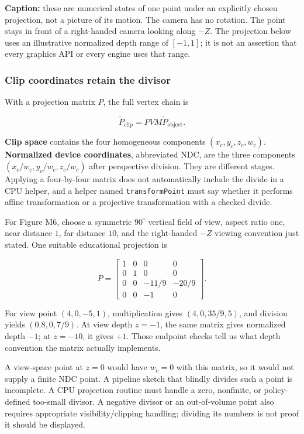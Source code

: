 \textbf{Caption:} these are numerical states of one point under an explicitly chosen projection, not a picture of its motion. The camera has no rotation. The point stays in front of a right-handed camera looking along \(-Z\). The projection below uses an illustrative normalized depth range of \([-1,1]\); it is not an assertion that every graphics API or every engine uses that range.

\subsubsection{Clip coordinates retain the divisor}\label{clip-coordinates-retain-the-divisor}

With a projection matrix \(P\), the full vertex chain is

\[
\widetilde P_{\mathrm{clip}}=PVM\widetilde P_{\mathrm{object}}.
\]

\textbf{Clip space} contains the four homogeneous components \((x_c,y_c,z_c,w_c)\). \textbf{Normalized device coordinates}, abbreviated NDC, are the three components \((x_c/w_c,y_c/w_c,z_c/w_c)\) after perspective division. They are different stages. Applying a four-by-four matrix does not automatically include the divide in a CPU helper, and a helper named \texttt{transformPoint} must say whether it performs affine transformation or a projective transformation with a checked divide.

For Figure M6, choose a symmetric \(90^\circ\) vertical field of view, aspect ratio one, near distance \(1\), far distance \(10\), and the right-handed \(-Z\) viewing convention just stated. One suitable educational projection is

\[
P=\begin{bmatrix}
1&0&0&0\\
0&1&0&0\\
0&0&-11/9&-20/9\\
0&0&-1&0
\end{bmatrix}.
\]

For view point \((4,0,-5,1)\), multiplication gives \((4,0,35/9,5)\), and division yields \((0.8,0,7/9)\). At view depth \(z=-1\), the same matrix gives normalized depth \(-1\); at \(z=-10\), it gives \(+1\). Those endpoint checks tell us what depth convention the matrix actually implements.

A view-space point at \(z=0\) would have \(w_c=0\) with this matrix, so it would not supply a finite NDC point. A pipeline sketch that blindly divides such a point is incomplete. A CPU projection routine must handle a zero, nonfinite, or policy-defined too-small divisor. A negative divisor or an out-of-volume point also requires appropriate visibility/clipping handling; dividing its numbers is not proof it should be displayed.

